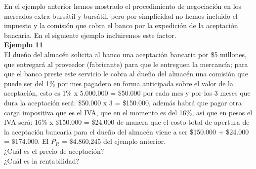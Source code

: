 	En el ejemplo anterior hemos mostrado el procedimiento de negociación en los mercados extra bursátil y bursátil, pero por simplicidad no hemos incluido el impuesto y la comisión que cobra el banco por la expedición de la aceptación bancaria. En el siguiente ejemplo incluiremos este factor.\\
	
	\textbf{Ejemplo 11}\\
	El dueño del almacén solicita al banco una aceptación bancaria por \$5 millones, que entregará al proveedor (fabricante) para que le entreguen la mercancía; para que el banco preste este servicio le cobra al dueño del almacén una comisión que puede ser del 1\% por mes pagadero en forma anticipada sobre el valor de la aceptación, esto es 1\% x 5.000.000 = \$50.000 por cada mes y por los 3 meses que dura la aceptación será: \$50.000 x 3 = \$150.000, además habrá que pagar otra carga impositiva que es el IVA, que en el momento es del 16\%, así que en pesos el IVA será: 16\% x \$150.000 = \$24.000 de manera que el costo total de apertura de la aceptación bancaria para el dueño del almacén viene a ser \$150.000 + \$24.000 = \$174.000. El $P_{R}$ = \$4.860,245 del ejemplo anterior.\\
	¿Cuál es el precio de aceptación? \\
	¿Cuál es la rentabilidad? \\
	
